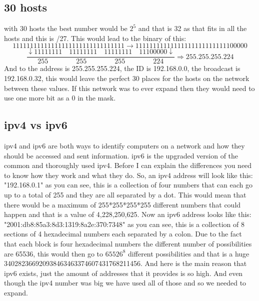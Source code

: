\documentclass{article}
\begin{document}
\subsection{30 hosts}
with 30 hosts the best number would be $2^{5}$ and that is 32 as that fits in all the hosts and this is /27. This would lead to the binary of this:
\[
	11111111111111111111111111111111 \rightarrow 11111111111111111111111111100000
\]
\[
	\frac{\downarrow 11111111 \quad 11111111 \quad 11111111 \quad 11100000 \downarrow}{255 \qquad \qquad 255 \qquad \qquad 255 \qquad \qquad 224} \Rightarrow 255.255.255.224
\]
And to the address is 255.255.255.224, the ID is 192.168.0.0, the broadcast is 192.168.0.32, this would leave the perfect 30 places for the hosts on the network between these values. If this network was to ever expand then they would need to use one more bit as a 0 in the mask. 
\subsection{ipv4 vs ipv6}
ipv4 and ipv6 are both ways to identify computers on a network and how they should be accessed and sent information. ipv6 is the upgraded version of the common and thoroughly used ipv4. Before I can explain the differences you need to know how they work and what they do. So, an ipv4 address will look like this: "192.168.0.1" as you can see, this is a collection of four numbers that can each go up to a total of 255 and they are all separated by a dot. This would mean that there would be a maximum of 255*255*255*255 different numbers that could happen and that is a value of 4,228,250,625. Now an ipv6 address looks like this: "2001:db8:85a3:8d3:1319:8a2e:370:7348" as you can see, this is a collection of 8 sections of 4 hexadecimal numbers each separated by a colon. Due to the fact that each block is four hexadecimal numbers the different number of possibilities are 65536, this would then go to $65526^{8}$ different possibilities and that is a huge 340282366920938463463374607431768211456. And here is the main reason that ipv6 exists, just the amount of addresses that it provides is so high. And even though the ipv4 number was big we have used all of those and so we needed to expand. 
\end{document}
